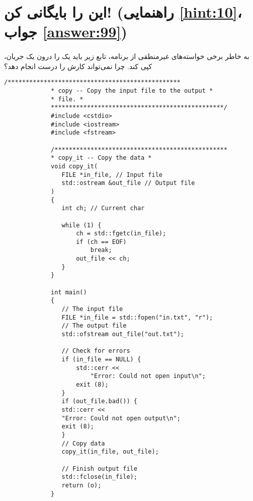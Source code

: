 \section[این را بایگانی کن!]{این را بایگانی کن! \protect{} (راهنمایی \ref{hint:10}، جواب \ref{answer:99})}
\paragraph{}\label{prog:88}
به خاطر برخی خواسته‌های غیرمنطقی از برنامه، تابع زیر باید یک  را درون یک جریان، کپی کند. چرا نمی‌تواند کارش را درست انجام دهد؟

\begin{LTR}
        \begin{lstlisting}[style=C++Style]
             /************************************************
             * copy -- Copy the input file to the output *
             * file. *
             ************************************************/
             #include <cstdio>
             #include <iostream>
             #include <fstream>

             /************************************************
             * copy_it -- Copy the data *
             void copy_it(
             	FILE *in_file, // Input file
             	std::ostream &out_file // Output file
             )
             {
             	int ch; // Current char

             	while (1) {
             		ch = std::fgetc(in_file);
             		if (ch == EOF)
             			break;
             		out_file << ch;
             	}
             }

             int main()
             {
             	// The input file
             	FILE *in_file = std::fopen("in.txt", "r");
             	// The output file
             	std::ofstream out_file("out.txt");

             	// Check for errors
             	if (in_file == NULL) {
             		std::cerr <<
             			"Error: Could not open input\n";
             		exit (8);
             	}
             	if (out_file.bad()) {
             	std::cerr <<
             	"Error: Could not open output\n";
             	exit (8);
             	}
             	// Copy data
             	copy_it(in_file, out_file);

             	// Finish output file
             	std::fclose(in_file);
             	return (o);
             }
        \end{lstlisting}
\end{LTR}